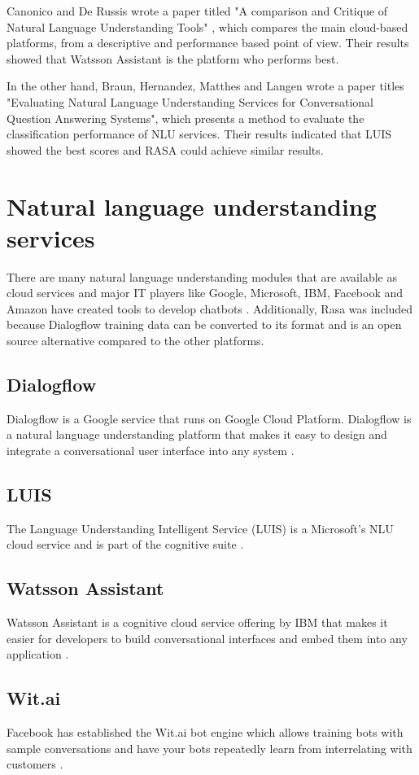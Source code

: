 \documentclass[conference]{IEEEtran}
\begin{document}
Canonico and De Russis wrote a paper titled "A comparison and Critique of Natural Language Understanding Tools" \cite{Canonico2018}, which compares the main cloud-based platforms, from a descriptive and performance based point of view. Their results showed that Watsson Assistant is the platform who performs best.

In the other hand, Braun, Hernandez, Matthes and Langen wrote a paper titles "Evaluating Natural Language Understanding Services for Conversational Question Answering Systems", which presents a method to evaluate the classification performance of NLU services. Their results indicated that LUIS showed the best scores and RASA could achieve similar results.

\section{Natural language understanding services} \label{sec:nluServices}
There are many natural language understanding modules that are available as cloud services and major IT players like Google, Microsoft, IBM, Facebook and Amazon have created tools to develop chatbots \cite{hall2017hands}. Additionally, Rasa was included because Dialogflow training data can be converted to its format and is an open source alternative compared to  the other platforms.
\subsection{Dialogflow}
Dialogflow is a Google service that runs on Google Cloud Platform. Dialogflow is a natural language understanding platform that makes it easy to design and integrate a conversational user interface into any system \cite{dialogflow2020}.
\subsection{LUIS}
The Language Understanding Intelligent Service (LUIS) is a Microsoft's NLU cloud service and is part of the cognitive suite \cite{pathak2018iot}.
\subsection{Watsson Assistant}
Watsson Assistant is a cognitive cloud service offering by IBM that makes it easier for developers to build conversational interfaces and embed them into any application \cite{sabharwal2019developing}.
\subsection{Wit.ai}
Facebook has established the Wit.ai bot engine which allows training bots with sample conversations and have your bots repeatedly learn from interrelating with customers \cite{seligman2018artificial}.
\end{document}
